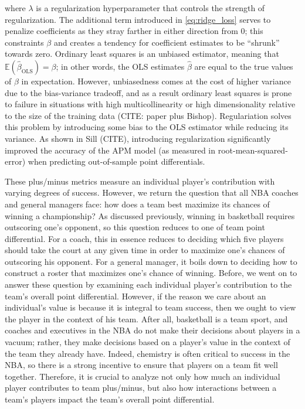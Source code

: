 where $\lambda$ is a regularization hyperparameter that controls the strength of
regularization. The additional term introduced in \eqref{eq:ridge_loss} serves to
penalize coefficients as they stray farther in either direction from 0; this
constraints $\beta$ and creates a tendency for coefficient estimates to be “shrunk”
towards zero. Ordinary least squares is an unbiased estimator, meaning that
$\mathbb{E} \left(\hat\beta_{\text{OLS}}\right) = \beta$; in other words, the OLS
estimates $\hat\beta$ are equal to the true values of $\beta$ in expectation.
However, unbiasedness comes at the cost of higher variance due to the bias-variance
tradeoff, and as a result ordinary least squares is prone to failure in situations
with high multicollinearity or high dimensionality relative to the size of the
training data (CITE: paper plus Bishop). Regulariation solves this problem by
introducing some bias to the OLS estimator while reducing its variance. As shown in
Sill (CITE), introducing regularization significantly improved the accuracy of
the APM model (as measured in root-mean-squared-error) when predicting out-of-sample
point differentials.

These plus/minus metrics measure an individual player's contribution with varying
degrees of success. However, we return the question that all NBA coaches and general
managers face: how does a team best maximize its chances of winning a championship?
As discussed previously, winning in basketball requires outscoring one's opponent,
so this question reduces to one of team point differential. For a coach, this in
essence reduces to deciding which five players should take the court at any given
time in order to maximize one's chances of outscoring his opponent. For a general
manager, it boils down to deciding how to construct a roster that maximizes one's
chance of winning. Before, we went on to answer these question by examining each
individual player's contribution to the team's overall point differential. However,
if the reason we care about an individual's value is because it is integral to team
success, then we ought to view the player in the context of his team. After all,
basketball is a team sport, and coaches and executives in the NBA do not make their
decisions about players in a vacuum; rather, they make decisions based on a player’s
value in the context of the team they already have. Indeed, chemistry is often
critical to success in the NBA, so there is a strong incentive to ensure that
players on a team fit well together. Therefore, it is crucial to analyze not only
how much an individual player contributes to team plus/minus, but also how
interactions between a team's players impact the team's overall point differential.

